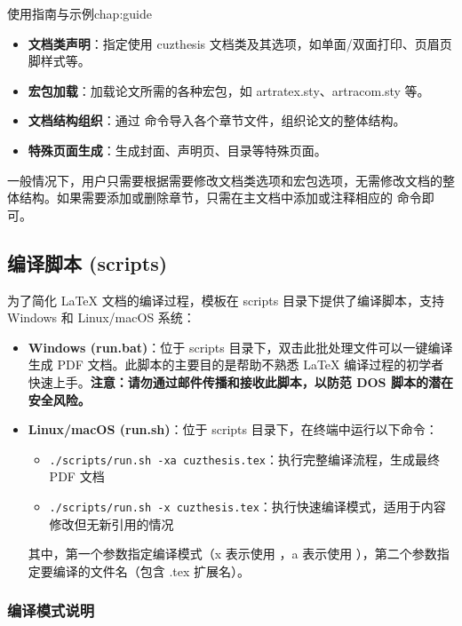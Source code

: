 \begin{cuzchapter}{使用指南与示例}{chap:guide}
    \begin{itemize}
        \item \textbf{文档类声明}：指定使用 cuzthesis 文档类及其选项，如单面/双面打印、页眉页脚样式等。
        \item \textbf{宏包加载}：加载论文所需的各种宏包，如 artratex.sty、artracom.sty 等。
        \item \textbf{文档结构组织}：通过 \verb|| 命令导入各个章节文件，组织论文的整体结构。
        \item \textbf{特殊页面生成}：生成封面、声明页、目录等特殊页面。
    \end{itemize}

    一般情况下，用户只需要根据需要修改文档类选项和宏包选项，无需修改文档的整体结构。如果需要添加或删除章节，只需在主文档中添加或注释相应的 \verb|| 命令即可。

    \subsection{编译脚本 (scripts)}\label{sub:scripts}

    为了简化 \LaTeX{} 文档的编译过程，模板在 scripts 目录下提供了编译脚本，支持 Windows 和 Linux/macOS 系统：

    \begin{itemize}
        \item \textbf{Windows (run.bat)}：位于 scripts 目录下，双击此批处理文件可以一键编译生成 PDF 文档。此脚本的主要目的是帮助不熟悉 \LaTeX{} 编译过程的初学者快速上手。\textbf{注意：请勿通过邮件传播和接收此脚本，以防范 DOS 脚本的潜在安全风险。}

        \item \textbf{Linux/macOS (run.sh)}：位于 scripts 目录下，在终端中运行以下命令：
              \begin{itemize}
                  \item \verb|./scripts/run.sh -xa cuzthesis.tex|：执行完整编译流程，生成最终 PDF 文档
                  \item \verb|./scripts/run.sh -x cuzthesis.tex|：执行快速编译模式，适用于内容修改但无新引用的情况
              \end{itemize}

              其中，第一个参数指定编译模式（x 表示使用 ，a 表示使用 ），第二个参数指定要编译的文件名（包含 .tex 扩展名）。
    \end{itemize}

    \subsubsection{编译模式说明}


\end{cuzchapter}
